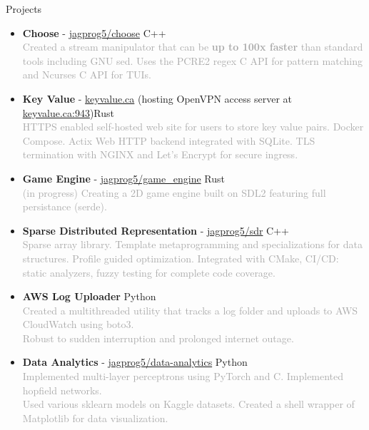 \documentclass{resume} %
\begin{document}
\begin{rSection}{Projects}
    \begin{itemize}
        \setlength\itemsep{-0.2em}
        \item {\bf Choose} - \href{https://github.com/jagprog5/choose/}{jagprog5/choose} \hfill C++\\
        \textcolor{darkgray}{Created a stream manipulator that can be \textbf{up to 100x faster} than standard tools including GNU sed.
        Uses the PCRE2 regex C API for pattern matching and Ncurses C API for TUIs.}
        \item {\bf Key Value} - \href{http://www.keyvalue.ca/}{keyvalue.ca} (hosting OpenVPN access server at \href{https://www.keyvalue.ca:943}{keyvalue.ca:943})\hfill Rust\\
        \textcolor{darkgray}{HTTPS enabled self-hosted web site for users to store key value pairs. Docker Compose. Actix Web HTTP backend integrated with SQLite. TLS termination with NGINX and Let's Encrypt for secure ingress.}
        \item {\bf Game Engine} - \href{https://github.com/jagprog5/game_engine/}{jagprog5/game\_engine} \hfill Rust\\
        \textcolor{darkgray}{(in progress) Creating a 2D game engine built on SDL2 featuring full persistance (serde).}
        \item {\bf Sparse Distributed Representation} - \href{https://github.com/jagprog5/SDR/}{jagprog5/sdr} \hfill C++\\
        \textcolor{darkgray}{Sparse array library. Template metaprogramming and specializations for data structures. Profile guided optimization. Integrated with CMake, CI/CD: static analyzers, fuzzy testing for complete code coverage.}
        \item {\bf AWS Log Uploader} \hfill Python\\
        \textcolor{darkgray}{Created a multithreaded utility that tracks a log folder and uploads to AWS CloudWatch using boto3.\\
        Robust to sudden interruption and prolonged internet outage.}
        \item {\bf Data Analytics} - \href{https://github.com/jagprog5/resume/blob/main/data-analytics-projects.md}{jagprog5/data-analytics} \hfill Python\\
        \textcolor{darkgray}{Implemented multi-layer perceptrons using PyTorch and C. Implemented hopfield networks.\\
        Used various sklearn models on Kaggle datasets. Created a shell wrapper of Matplotlib for data visualization.}
    \end{itemize}
\end{rSection}
\end{document}
